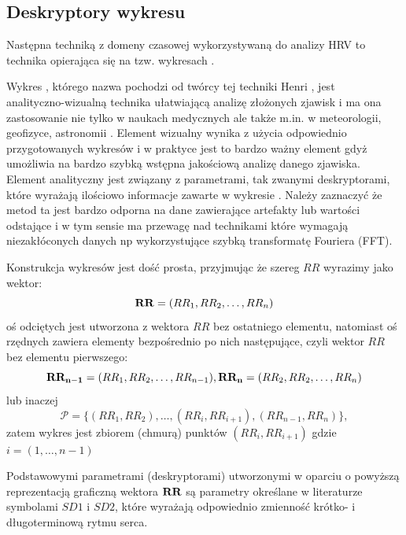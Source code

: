 \subsection{Deskryptory wykresu \PP{}}


Następna techniką z domeny czasowej wykorzystywaną do analizy HRV to technika opierająca
się na tzw. wykresach \PP{}.

Wykres \PP{}, którego nazwa pochodzi od twórcy tej techniki Henri \PP{}, jest\\ 
analityczno-wizualną technika ułatwiającą analizę złożonych zjawisk i ma ona zastosowanie
nie tylko w naukach medycznych ale także m.in. w meteorologii, geofizyce, astronomii \cite{ott}.
Element wizualny wynika z użycia odpowiednio przygotowanych wykresów i w praktyce jest to
bardzo ważny element gdyż umożliwia na bardzo szybką wstępna jakościową analizę danego
zjawiska. Element analityczny jest związany z parametrami, tak zwanymi deskryptorami,
które wyrażają ilościowo informacje zawarte w wykresie \PP{}. Należy zaznaczyć że
metod ta jest bardzo odporna na dane zawierające artefakty lub wartości odstające i w
tym sensie ma przewagę nad technikami które wymagają niezakłóconych danych np 
wykorzystujące szybką transformatę Fouriera (FFT).

Konstrukcja wykresów \PP{} jest dość prosta, przyjmując że szereg $RR$ wyrazimy jako
wektor:
\begin{equation}
\mathbf{RR} = (RR_{1}, RR_{2}, \ldots, RR_{n})
\end{equation}
oś odciętych jest utworzona z wektora $RR$ bez ostatniego elementu, natomiast oś rzędnych
zawiera elementy bezpośrednio po nich następujące, czyli wektor $RR$ bez elementu
pierwszego:
\begin{equation}
\mathbf{RR_{n-1}} = (RR_{1}, RR_{2}, \ldots, RR_{n-1}),
\mathbf{RR_n} = (RR_{2}, RR_{2}, \ldots, RR_{n})
\label{eq:wektory2} 
\end{equation}
lub inaczej
\begin{equation}
  \mathcal{P} = \{(RR_1, RR_2),\ldots, (RR_i, RR_{i+1}), (RR_{n-1}, RR_n )\},
 \label{eq:p_plot}
\end{equation}
zatem wykres \PP{} jest zbiorem (chmurą) punktów $(RR_{i}, RR_{i+1})$ gdzie $i=(1, \ldots, n-1)$

Podstawowymi parametrami (deskryptorami) utworzonymi w oparciu o powyższą reprezentacją 
graficzną wektora $\mathbf{RR}$ są parametry określane w literaturze symbolami $SD1$ i $SD2$, które
wyrażają odpowiednio zmienność krótko- i długoterminową rytmu serca.

